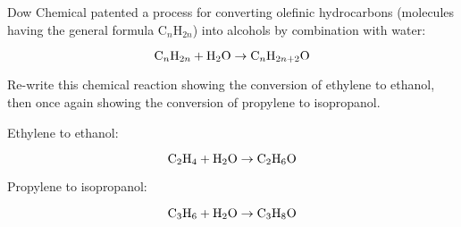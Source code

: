 

Dow Chemical patented a process for converting olefinic hydrocarbons (molecules having the general formula C$_{n}$H$_{2n}$) into alcohols by combination with water:

$$\hbox{C}_n\hbox{H}_{2n} + \hbox{H}_2\hbox{O} \to \hbox{C}_n\hbox{H}_{2n+2}\hbox{O}$$

Re-write this chemical reaction showing the conversion of ethylene to ethanol, then once again showing the conversion of propylene to isopropanol.







\noindent
Ethylene to ethanol:

$$\hbox{C}_2\hbox{H}_{4} + \hbox{H}_2\hbox{O} \to \hbox{C}_2\hbox{H}_{6}\hbox{O}$$

\vskip 10pt

\noindent
Propylene to isopropanol:

$$\hbox{C}_3\hbox{H}_{6} + \hbox{H}_2\hbox{O} \to \hbox{C}_3\hbox{H}_{8}\hbox{O}$$












